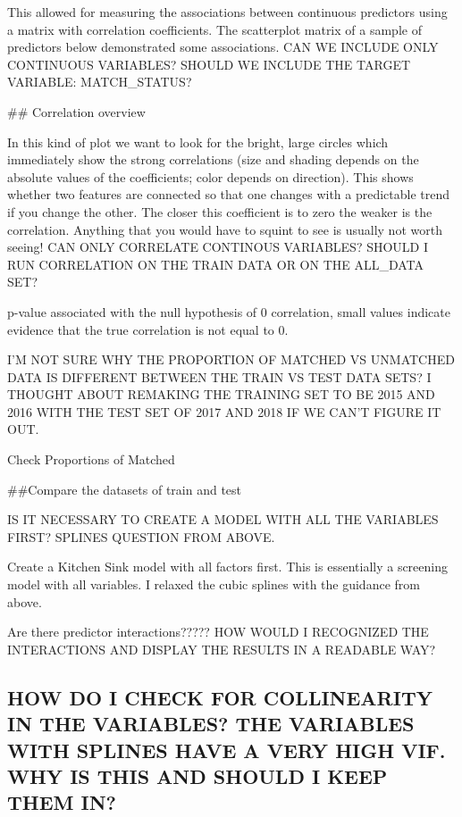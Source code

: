 \documentclass[12pt,]{article}
\begin{document}
This allowed for measuring the associations between continuous
predictors using a matrix with correlation coefficients. The scatterplot
matrix of a sample of predictors below demonstrated some associations.
CAN WE INCLUDE ONLY CONTINUOUS VARIABLES? SHOULD WE INCLUDE THE TARGET
VARIABLE: MATCH\_STATUS?

\#\# Correlation overview

In this kind of plot we want to look for the bright, large circles which
immediately show the strong correlations (size and shading depends on
the absolute values of the coefficients; color depends on direction).
This shows whether two features are connected so that one changes with a
predictable trend if you change the other. The closer this coefficient
is to zero the weaker is the correlation. Anything that you would have
to squint to see is usually not worth seeing! CAN ONLY CORRELATE
CONTINOUS VARIABLES? SHOULD I RUN CORRELATION ON THE TRAIN DATA OR ON
THE ALL\_DATA SET?

p-value associated with the null hypothesis of 0 correlation, small
values indicate evidence that the true correlation is not equal to 0.

I'M NOT SURE WHY THE PROPORTION OF MATCHED VS UNMATCHED DATA IS
DIFFERENT BETWEEN THE TRAIN VS TEST DATA SETS? I THOUGHT ABOUT REMAKING
THE TRAINING SET TO BE 2015 AND 2016 WITH THE TEST SET OF 2017 AND 2018
IF WE CAN'T FIGURE IT OUT.

Check Proportions of Matched

\#\#Compare the datasets of train and test

IS IT NECESSARY TO CREATE A MODEL WITH ALL THE VARIABLES FIRST? SPLINES
QUESTION FROM ABOVE.

Create a Kitchen Sink model with all factors first. This is essentially
a screening model with all variables. I relaxed the cubic splines with
the guidance from above.

Are there predictor interactions????? HOW WOULD I RECOGNIZED THE
INTERACTIONS AND DISPLAY THE RESULTS IN A READABLE WAY?

\hypertarget{how-do-i-check-for-collinearity-in-the-variables-the-variables-with-splines-have-a-very-high-vif.-why-is-this-and-should-i-keep-them-in}{%
\subsection{HOW DO I CHECK FOR COLLINEARITY IN THE VARIABLES? THE
VARIABLES WITH SPLINES HAVE A VERY HIGH VIF. WHY IS THIS AND SHOULD I
KEEP THEM
IN?}\label{how-do-i-check-for-collinearity-in-the-variables-the-variables-with-splines-have-a-very-high-vif.-why-is-this-and-should-i-keep-them-in}}
\end{document}
